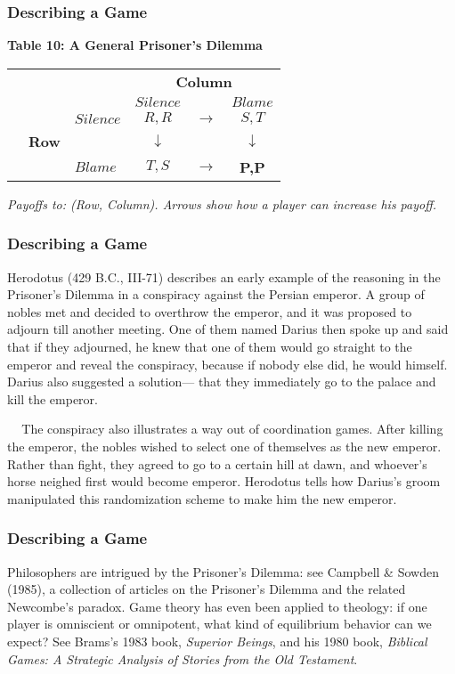  \begin{frame}[fragile]\frametitle{Describing a Game}
 
\begin{center} {\bf Table  10:   A General Prisoner's Dilemma }

 \begin{tabular}{lllccc}
  &       &       &\multicolumn{3}{c}{\bf Column}\\ &       &      &
$Silence$   &   &  $Blame$      \\
  &   & $ Silence $      &     $R,R$ & $\rightarrow$  & $S,T$ \\ & {\bf Row}
&&$\downarrow$& & $\downarrow$ \\ &  &   $Blame$     &    $ T,S $ &
$\rightarrow$  & {\bf P,P} \\
 \end{tabular} \end{center}

 {\it Payoffs  to:  (Row, Column). Arrows show how a player can increase his
payoff.   }

\end{frame}
 \begin{frame}[fragile]\frametitle{Describing a Game}

 
 Herodotus (429 B.C., III-71) describes an early example of the reasoning in the
{Prisoner's Dilemma } in a conspiracy against the Persian emperor.  A group of
nobles met and decided to overthrow the emperor, and it was proposed to adjourn
till another meeting.  One of them named Darius then spoke up and said that if
they adjourned, he knew that one of them would go straight to the emperor and
reveal the conspiracy,   because if nobody else did, he would himself. Darius
also suggested a solution--- that they immediately go to the palace and kill the
emperor.

$\;\;\;$ The conspiracy also illustrates a way out of coordination games.  After
killing the emperor, the nobles wished to select one of themselves as the new
emperor. Rather than fight, they agreed to go to a certain hill at dawn, and
whoever's horse neighed first would become emperor. Herodotus  tells how
Darius's groom manipulated this randomization scheme to make him the new
emperor.

\end{frame}
 \begin{frame}[fragile]\frametitle{Describing a Game}
 Philosophers are intrigued by  the {Prisoner's Dilemma}: see Campbell \&
Sowden (1985), a collection of articles on  the { Prisoner's Dilemma} and the
related Newcombe's paradox.   Game theory has even been applied to theology: if
one player is omniscient or omnipotent,  what kind of equilibrium behavior can
we expect? See Brams's 1983 book, {\it Superior Beings}, and   his 1980 book,
{\it Biblical Games: A Strategic Analysis of Stories from the Old Testament}.

\end{frame}
